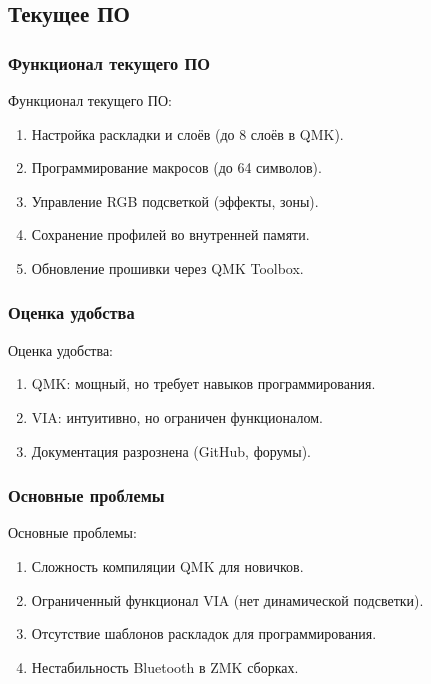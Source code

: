 \subsection{Текущее ПО}

\subsubsection{Функционал текущего ПО}

Функционал текущего ПО:

\begin{enumerate}
\item Настройка раскладки и слоёв (до 8 слоёв в QMK).
\item Программирование макросов (до 64 символов).
\item Управление RGB подсветкой (эффекты, зоны).
\item Сохранение профилей во внутренней памяти.
\item Обновление прошивки через QMK Toolbox.
\end{enumerate}

\subsubsection{Оценка удобства}

Оценка удобства:

\begin{enumerate}
\item QMK: мощный, но требует навыков программирования.
\item VIA: интуитивно, но ограничен функционалом.
\item Документация разрознена (GitHub, форумы).
\end{enumerate}

\subsubsection{Основные проблемы}

Основные проблемы:

\begin{enumerate}
\item Сложность компиляции QMK для новичков.
\item Ограниченный функционал VIA (нет динамической подсветки).
\item Отсутствие шаблонов раскладок для программирования.
\item Нестабильность Bluetooth в ZMK сборках.
\end{enumerate}

